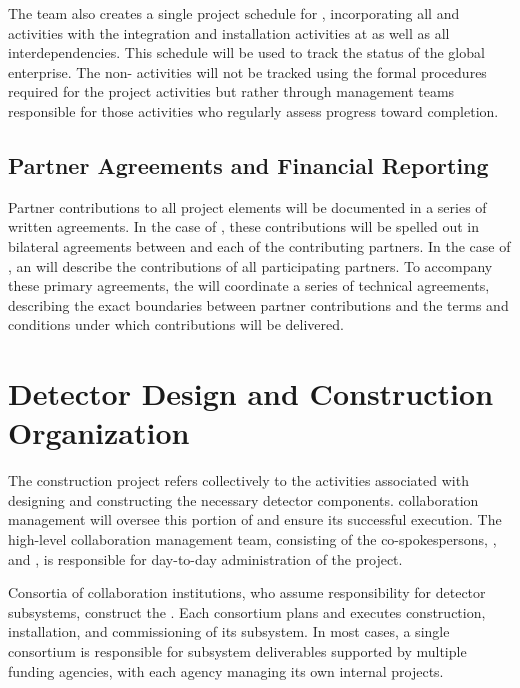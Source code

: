 The  team also creates a single 
project schedule for , incorporating all 
 and  activities with the 
integration and installation activities at  
as well as all interdependencies.  This schedule will 
be used to track the status of the global enterprise.  
  The non- activities 
will not be tracked using the formal  procedures 
required for the  project activities but rather 
through management teams responsible for those activities who regularly assess progress toward completion.  


\subsection{Partner Agreements and Financial Reporting}
\label{sec:dune_agreements}

Partner contributions to all project elements will be documented %
in a series of written agreements.  In the case of , 
these contributions will be spelled out in bilateral agreements 
between  and each of the contributing partners.  In 
the case of , an  will describe  
the contributions of all participating partners. %
 To accompany these primary agreements, the   will coordinate a series of technical agreements, describing the exact 
boundaries between partner contributions and the terms and 
conditions under which contributions will be delivered. 

\section{Detector Design and Construction Organization}
\label{sec:es-tc-det-const}

The   construction project refers collectively 
to the activities associated with designing and constructing the
necessary detector components.   collaboration management 
will oversee this portion of  and 
ensure its successful execution.  The high-level  
collaboration management team, consisting of the co-spokespersons, 
, and , is responsible for day-to-day 
administration of the project.  

Consortia of collaboration institutions, who assume responsibility 
for detector subsystems, construct the  . Each consortium plans and executes 
construction, installation, and commissioning of its subsystem.  In most cases, a single consortium is responsible for subsystem deliverables supported by 
multiple funding agencies, with each agency managing its own internal projects. 

